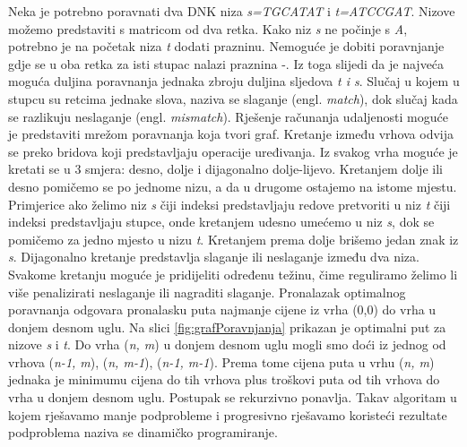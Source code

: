 \documentclass[times, utf8, zavrsni, numeric]{fer}
\begin{document}
Neka je potrebno poravnati dva DNK niza \textit{s=TGCATAT} i \textit{t=ATCCGAT}. Nizove možemo predstaviti s matricom od dva retka. Kako niz \textit{s} ne počinje s \textit{A}, potrebno je na početak niza \textit{t} dodati prazninu. Nemoguće je dobiti poravnjanje gdje se u oba retka za isti stupac nalazi praznina -. Iz toga slijedi da je najveća moguća duljina poravnanja jednaka zbroju duljina sljedova \textit{t i s}. Slučaj u kojem u stupcu su  retcima jednake slova, naziva se slaganje (engl. \textit{match}), dok slučaj  kada se razlikuju neslaganje (engl. \textit{mismatch}). Rješenje računanja udaljenosti moguće je predstaviti mrežom poravnanja koja tvori graf. Kretanje između vrhova odvija se preko bridova  koji predstavljaju operacije uređivanja. Iz svakog vrha moguće je kretati se u 3 smjera: desno, dolje i dijagonalno dolje-lijevo. Kretanjem dolje ili desno pomičemo se po jednome nizu, a da u drugome ostajemo na istome mjestu. Primjerice ako želimo niz \textit{s} čiji indeksi predstavljaju redove pretvoriti u niz \textit{t} čiji indeksi predstavljaju stupce, onde kretanjem udesno umećemo u niz \textit{s}, dok se pomičemo za jedno mjesto u nizu \textit{t}. Kretanjem prema dolje brišemo jedan znak iz \textit{s}. Dijagonalno kretanje predstavlja slaganje ili neslaganje između dva niza. Svakome kretanju moguće je pridijeliti određenu težinu, čime reguliramo želimo li više penalizirati neslaganje ili nagraditi slaganje. Pronalazak optimalnog poravnanja odgovara pronalasku puta najmanje cijene iz vrha (0,0) do vrha u donjem desnom uglu. Na slici \ref{fig:grafPoravnjanja} prikazan je optimalni put za nizove \textit{s} i \textit{t}. Do vrha (\textit{n, m}) u donjem desnom uglu mogli smo doći iz jednog od vrhova (\textit{n-1, m}), (\textit{n, m-1}), (\textit{n-1, m-1}). Prema tome cijena puta u vrhu (\textit{n, m}) jednaka je minimumu cijena do tih vrhova plus troškovi puta od tih vrhova do vrha u donjem desnom uglu. Postupak se rekurzivno ponavlja. Takav algoritam u kojem rješavamo manje podprobleme i progresivno rješavamo koristeći rezultate podproblema  naziva se dinamičko programiranje.
\end{document}
